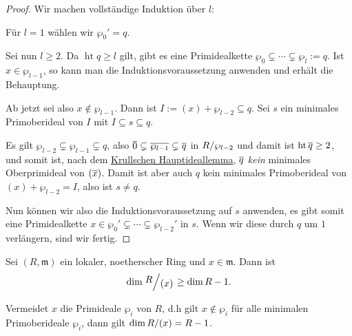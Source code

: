 \documentclass[a4paper,12pt,index=toc]{scrbook}
\theoremstyle{keinenummern} %
\def\m{\mathfrak{m}}
\newcommand{\hoehe}{\operatorname{ht}}
\def\Bar#1{\ensuremath\overline{#1}}
\begin{document}
\begin{proof} Wir machen vollständige Induktion über $l$:

Für $l=1$ wählen wir $\wp_0'=q$.

Sei nun $l\ge 2$. Da $\hoehe q\geq l$ gilt, gibt es eine Primidealkette $\wp_0\subsetneq\dotsm\subsetneq \wp_l:=q$. Ist $x \in \wp_{l-1}$, so kann man die Induktionsvoraussetzung anwenden und erhält die Behauptung.

Ab jetzt sei also $x\notin \wp_{l-1}$. Dann ist $I:=(x) + \wp_{l-2}\subseteq q$. Sei $s$ ein minimales Prim\-ober\-ideal von $I$ mit $I\subseteq s\subseteq q$.

Es gilt $\wp_{l-2}\subsetneq \wp_{l-1}\subsetneq q$, also $\Bar{0}\subsetneq\Bar{\wp_{l-1}}\subsetneq \Bar{q}$ in $\Quotient{R}{\wp_{l-2}}$ und damit ist $\hoehe \Bar{q}\geq 2$, und somit ist, nach dem \hyperref[khil]{Krullschen Hauptideallemma}, $\Bar{q}$ \textit{kein} minimales Oberprimideal von $(\Bar{x})$. Damit ist aber auch $q$ kein minimales Primoberideal von $(x)+\wp_{l-2}=I$, also ist $s\neq q$.

Nun können wir also die Induktionsvoraussetzung auf $s$ anwenden, es gibt somit eine Primidealkette $x\in \wp_0'\subsetneq \dotsm\subsetneq \wp_{l-2}'$ in $s$. Wenn wir diese durch $q$ um $1$ verlängern, sind wir fertig.
\end{proof}

\begin{kor}\label{3.5.2}
Sei $(R,\m)$ ein lokaler, noetherscher Ring und $x\in \m$. Dann ist \begin{equation*}\dim \Quotient{R}{(x)}\ge \dim R-1.\end{equation*}

Vermeidet $x$ die Primideale $\wp_i$ von $R$, d.h gilt $x\notin \wp_i$ für alle minimalen Primoberideale $\wp_i$, dann gilt $\dim \Quotient{R}{(x)}=R-1$.
\end{kor}
\end{document}
